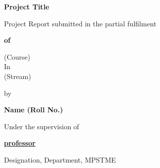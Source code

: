 \begin{titlepage}
    \centering



    
    \vspace*{1cm}
    {\fontsize{18pt}{22pt}\selectfont \textbf{Project Title} \par}
    
    \vfill %
    
    {\fontsize{12pt}{14pt}\selectfont Project Report submitted in the partial fulfilment \par}
    
    \vspace{0.8cm}
    {\textbf{of}}
    
    \vspace{0.8cm}
    {(Course) \\ In \\ (Stream) \par}
    
    \vfill 
    
    {by \par}
    
    \vspace{1.5cm}
    {\textbf{Name (Roll No.)} \par}
    
    \vfill
    
    {Under the supervision of \par}
    
    \vspace{0.3cm}
    {\underline{\textbf{professor}} \par}
    
    \vspace{0.2cm}
    {Designation, Department, MPSTME \par}
    
    \vspace*{2cm}
    
\end{titlepage}
